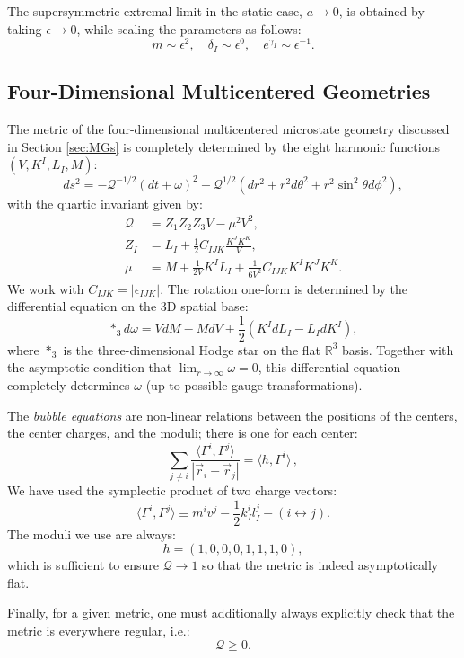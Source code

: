 \documentclass[12pt,a4paper]{article}
\newcommand{\be}{\begin{equation}}
\newcommand{\ee}{\end{equation}}
\begin{document}
The supersymmetric extremal limit in the static case, $a\rightarrow0$, is obtained by taking $\epsilon\rightarrow0$, while scaling the parameters as follows:
\begin{equation}
m\sim\epsilon^2,\quad \delta_I\sim\epsilon^0,\quad e^{\gamma_I}\sim\epsilon^{-1}.
\end{equation}

\subsection{Four-Dimensional Multicentered Geometries}\label{app:MGs}
The metric of the four-dimensional multicentered microstate geometry discussed in Section \ref{sec:MGs} is completely determined by the eight harmonic functions $(V,K^I, L_I, M)$:
\be ds^2 = - \mathcal{Q}^{-1/2}(dt +  \omega)^2 + \mathcal{Q}^{1/2}\left( dr^2 + r^2d\theta^2 + r^2\sin^2\theta d\phi^2\right),\ee
with the quartic invariant given by:
\begin{align} \label{eq:quarticinvdef} \mathcal{Q} &= Z_1 Z_2 Z_3 V - \mu^2 V^2,\\
 Z_I &= L_I + \frac12 C_{IJK} \frac{K^J K^K}{V}, \\ \mu &= M + \frac{1}{2V} K^I L_I + \frac{1}{6V^2}C_{IJK}K^I K^J K^K.
 \end{align}
 We work with $C_{IJK} = |\epsilon_{IJK}|$. The rotation one-form is determined by the differential equation on the 3D spatial base:
\be \label{eq:omegadiff} *_3 d\omega = V dM -M dV + \frac12\left( K^I dL_I - L_I dK^I\right),\ee
where $*_3$ is the three-dimensional Hodge star on the flat $\mathbb{R}^3$ basis. Together with the asymptotic condition that $\lim_{r\rightarrow\infty}\omega =0$, this differential equation completely determines $\omega$ (up to possible gauge transformations).

The \emph{bubble equations} are non-linear relations between the positions of the centers, the center charges, and the moduli; there is one for each center:
\be \label{eq:bubbleeqs} \sum_{j\neq i} \frac{\langle\Gamma^i, \Gamma^j\rangle}{ |\vec{r}_i - \vec{r}_j|} = \langle h, \Gamma^i\rangle\, ,
\ee
We have used the symplectic product of two charge vectors:
\be \label{eq:symplprod} \langle \Gamma^i, \Gamma^j \rangle \equiv m^i v^j - \frac12 k_I^i l_I^j - (i\leftrightarrow j).\ee
The moduli we use are always:
\be h = (1,0,0,0,1,1,1,0),\ee
which is sufficient to ensure $\mathcal{Q}\rightarrow 1$ so that the metric is indeed asymptotically flat.

Finally, for a given metric, one must additionally always explicitly check that the metric is everywhere regular, i.e.:
\be \mathcal{Q} \geq 0 .\ee
\end{document}
